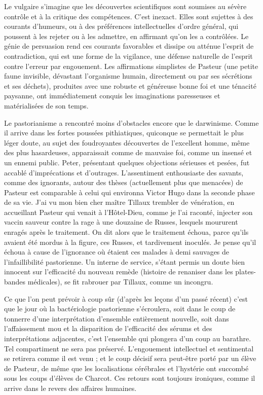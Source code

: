 \documentclass[french,twoside]{book} %
\begin{document}
Le vulgaire s’imagine que les découvertes scientifiques sont soumises au sévère contrôle et à la critique des compétences. C’est inexact. Elles sont sujettes à des courants d’humeurs, ou à des préférences intellectuelles d’ordre général, qui poussent à les rejeter ou à les admettre, en affirmant qu’on les a contrôlées. Le génie de persuasion rend ces courants favorables et dissipe ou atténue l’esprit de contradiction, qui est une forme de la vigilance, une défense naturelle de l’esprit contre l’erreur par engouement. Les affirmations simplistes de Pasteur (une petite faune invisible, dévastant l’organisme humain, directement ou par ses sécrétions et ses déchets), produites avec une robuste et généreuse bonne foi et une ténacité paysanne, ont immédiatement conquis les imaginations paresseuses et matérialisées de son temps.\par
Le pastorianisme a rencontré moins d’obstacles encore que le darwinisme. Comme il arrive dans les fortes poussées pithiatiques, quiconque se permettait le plus léger doute, au sujet des foudroyantes découvertes de l’excellent homme, même des plus hasardeuses, apparaissait comme de mauvaise foi, comme un insensé et un ennemi public. Peter, présentant quelques objections sérieuses et pesées, fut accablé d’imprécations et d’outrages. L’assentiment enthousiaste des savants, comme des ignorants, autour des thèses (actuellement plus que menacées) de Pasteur est comparable à celui qui environna Victor Hugo dans la seconde phase de sa vie. J’ai vu mon bien cher maître Tillaux trembler de vénération, en accueillant Pasteur qui venait à l’Hôtel-Dieu, comme je l’ai raconté, injecter son vaccin sauveur contre la rage à une douzaine de Russes, lesquels moururent enragés après le traitement. On dit alors que le traitement échoua, parce qu’ils avaient été mordus à la figure, ces Russes, et tardivement inoculés. Je pense qu’il échoua à cause de l’ignorance où étaient ces malades à demi sauvages de l’infaillibilité pastorienne. Un interne de service, s’étant permis un doute bien innocent sur l’efficacité du nouveau remède (histoire de renaniser dans les plates-bandes médicales), se fit rabrouer par Tillaux, comme un incongru.\par
Ce que l’on peut prévoir à coup sûr (d’après les leçons d’un passé récent) c’est que le jour où la bactériologie pastorienne s’écroulera, soit dans le coup de tonnerre d’une interprétation d’ensemble entièrement nouvelle, soit dans l’affaissement mou et la disparition de l’efficacité des sérums et des interprétations adjacentes, c’est l’ensemble qui plongera d’un coup au barathre. Tel compartiment ne sera pas préservé. L’engouement intellectuel et sentimental se retirera comme il est venu ; et le coup décisif sera peut-être porté par un élève de Pasteur, de même que les localisations cérébrales et l’hystérie ont succombé sous les coups d’élèves de Charcot. Ces retours sont toujours ironiques, comme il arrive dans le revers des affaires humaines.\par
\end{document}
